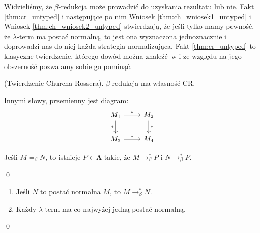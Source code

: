 Widzieliśmy, że \(\beta\)-redukcja może prowadzić do uzyskania rezultatu lub nie. Fakt \ref{thm:cr_untyped} i następujące po nim Wniosek \ref{thm:ch_wniosek1_untyped} i Wniosek \ref{thm:ch_wniosek2_untyped} stwierdzają, że jeśli tylko mamy pewność, że \(\lambda\)-term ma postać normalną, to jest ona wyznaczona jednoznacznie i doprowadzi nas do niej każda strategia normalizująca. Fakt \ref{thm:cr_untyped} to klasyczne twierdzenie, którego dowód można znaleźć w \cite{Barendregt_1992} i ze względu na jego obszerność pozwalamy sobie go pominąć. 

\begin{fakt}(Twierdzenie Churcha-Rossera)\label{thm:cr_untyped}. 
\(\beta\)-redukcja ma własność CR. 
\end{fakt}
Innymi słowy, przemienny jest diagram:
\[ \begin{tikzcd}
M_1 \arrow{r}{*} \arrow[swap]{d}{*} & M_2 \arrow{d}{*} \\%
M_3 \arrow{r}{*}& M_4
\end{tikzcd}
\] 

\begin{wniosek}\label{thm:ch_wniosek1_untyped}
  Jeśli \(M=_\beta N\), to istnieje \(P\in\mathbf{\Lambda}\) takie, że \(M\to^{*}_\beta P\) i \(N\to^{*}_\beta P\).
\end{wniosek}
\begin{dowod}
  \qed
\end{dowod}

\begin{wniosek}\label{thm:ch_wniosek2_untyped}
    \begin{enumerate}[label={(\arabic*)}, ref={(\arabic*)}]
  \setlength\itemsep{0em}
  \item Jeśli \(N\) to postać normalna \(M\), to \(M\to^{*}_\beta N\).
  \item Każdy \(\lambda\)-term ma co najwyżej jedną postać normalną.
  \end{enumerate}
\end{wniosek}
\begin{dowod}
  \qed
\end{dowod}
